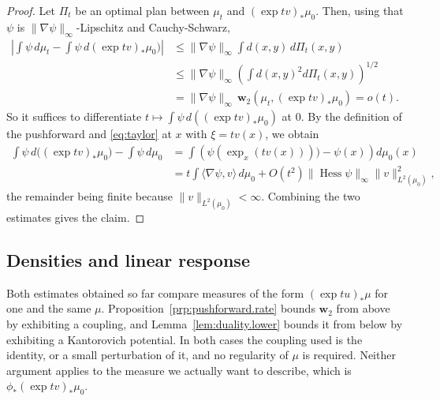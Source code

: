 \documentclass[11pt,reqno]{amsart}
\theoremstyle{plain}
\theoremstyle{definition}
\newcommand{\dw}{\mathbf{w}_2}
\DeclareMathOperator{\Hess}{Hess}
\begin{document}
\begin{proof}
    Let \( \Pi_t \) be an optimal plan between \( \mu_t \) and \( (\exp tv)_\ast\mu_0 \).  
    Then, using that \( \psi \) is \( \lVert \nabla\psi \rVert_\infty \)-Lipschitz and Cauchy-Schwarz, 
    \begin{align*}
        \left\lvert\int\psi\,d\mu_t-\int\psi\,d(\exp tv)_\ast\mu_0)\right\rvert
        &\le\lVert \nabla\psi \rVert_\infty\int d(x,y)\,d\Pi_t(x,y)\\
        &\le\lVert \nabla\psi \rVert_\infty\left(\int d(x,y)^2d\Pi_t(x,y)\right)^{1/2} \\
        &=\lVert \nabla\psi \rVert_\infty\,\dw(\mu_t,(\exp tv)_\ast\mu_0)=o(t).
    \end{align*}
    So it suffices to differentiate \( t\mapsto\int\psi\,d((\exp tv)_\ast\mu_0) \) at \( 0 \). 
    By the definition of the pushforward and \eqref{eq:taylor} at \(x\) with \(\xi=tv(x)\), we obtain
    \[
    \begin{split}
        \int\psi\,d\bigl((\exp tv)_\ast\mu_0\bigr)-\int\psi\,d\mu_0
        & =\int\left(\psi(\exp_x(tv(x))))-\psi(x)\right)d\mu_0(x) \\
        &=t\!\int\langle\nabla\psi,v\rangle\,d\mu_0+O(t^2)\lVert\Hess\psi\rVert_\infty\lVert v \rVert^2_{L^2(\mu_0)},
    \end{split}
    \]
    the remainder being finite because \( \lVert v \rVert_{L^2(\mu_0)}<\infty \).
    Combining the two estimates gives the claim.
\end{proof}

\subsection{Densities and linear response}
\label{sec:exp.deformations}

Both estimates obtained so far compare measures of the form \( (\exp tu)_\ast\mu \) for one and the same \( \mu \).
Proposition~\ref{prp:pushforward.rate} bounds \( \dw \) from above by exhibiting a coupling, and Lemma~\ref{lem:duality.lower} bounds it from below by exhibiting a Kantorovich potential.
In both cases the coupling used is the identity, or a small perturbation of it, and no regularity of \( \mu \) is required.
Neither argument applies to the measure we actually want to describe, which is \( \phi_\ast(\exp tv)_\ast\mu_0 \).
\end{document}
